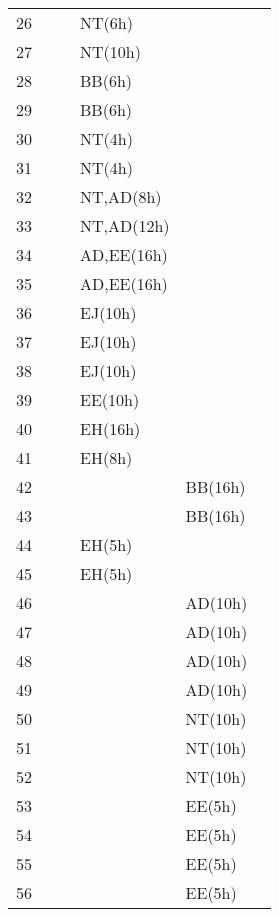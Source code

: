 \begin{longtable}[l]{|c|X|X|X|X|X|}
	26 	& 					& 					& NT(6h)				& 					\\ 
	27 	& 					& 					& NT(10h)				&					\\ 	
	28 	& 					& 					& BB(6h)				&					\\ 
	29 	& 		 			& 					& BB(6h)				& 					\\ 
	30 	& 					& 					& NT(4h)				& 					\\ 
	31 	& 					& 					& NT(4h)				&					\\ 	
	32 	& 					& 					& NT,AD(8h)					&					\\ 
	33 	& 		 			& 					& NT,AD(12h)					& 					\\ 
	34 	& 					& 					& AD,EE(16h)					& 					\\ 
	35 	& 					& 					& AD,EE(16h)					&					\\ 	
	36 	& 					& 					& EJ(10h)					&					\\ 
	37 	& 		 			& 					& EJ(10h)					& 					\\ 
	38 	& 					& 					& EJ(10h)				& 					\\ 
	39 	& 					& 					& EE(10h)					&					\\ 	
	40 	& 					& 					& EH(16h)					&					\\ 
	41 	& 		 			& 					& EH(8h)				& 					\\ 
	42 	& 					& 					& 					& BB(16h)					\\ 
	43 	& 					& 					& 					& BB(16h)					\\ 	
	44 	& 					& 					& EH(5h)					&					\\ 
	45 	& 		 			& 					& EH(5h)					& 					\\ 
	46 	& 					& 					& 					& AD(10h)					\\ 
	47 	& 					& 					& 					& AD(10h)					\\ 	
	48 	& 					& 					& 					& AD(10h)					\\ \hline
	49 	& 		 			& 					& 					& AD(10h)					\\ 
	50 	& 					& 					& 					& NT(10h)					\\ 
	51 	& 					& 					& 					& NT(10h)					\\ 	
	52 	& 					& 					& 					& NT(10h)					\\ 
	53 	& 		 			& 					& 					& EE(5h)					\\ 
	54 	& 					& 					& 					& EE(5h)					\\ 
	55 	& 					& 					& 					& EE(5h)					\\ 	
	56 	& 					& 					& 					& EE(5h)					\\ 

\end{longtable}

